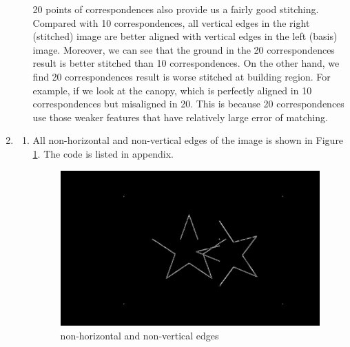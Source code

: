 \documentclass[12pt]{article}
\begin{document}
\begin{enumerate}
\begin{enumerate}
20 points of correspondences also provide us a fairly good stitching. Compared with 10 correspondences, all vertical edges in the right (stitched) image are better aligned with vertical edges in the left (basis) image. Moreover, we can see that the ground in the 20 correspondences result is better stitched than 10 correspondences. On the other hand, we find 20 correspondences result is worse stitched at building region. For example, if we look at the canopy, which is perfectly aligned in 10 correspondences but misaligned in 20. This is because 20 correspondences use those weaker features that have relatively large error of matching.

 

	\end{enumerate}
	\pagebreak
	\item 
	\begin{enumerate}
		\item All non-horizontal and non-vertical edges of the image is shown in Figure \ref{fig: 1a}. The code is listed in appendix.
		\begin{figure}[H]
			\centering
			\includegraphics[width=\textwidth]{steerable_filter_output}
			\caption{non-horizontal and non-vertical edges}
			\label{fig: 1a}
		\end{figure}
	

\end{enumerate}
\end{enumerate}
\end{document}
